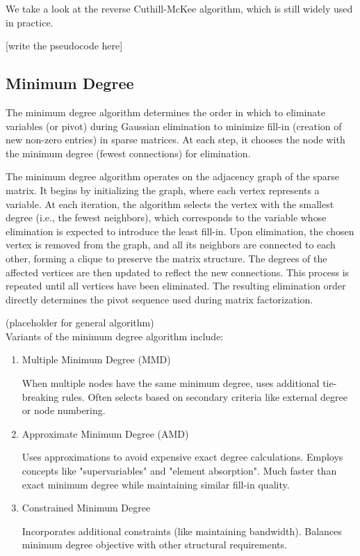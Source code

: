 We take a look at the reverse Cuthill-McKee algorithm, which is still widely used in practice. 

[write the pseudocode here]

\subsection{Minimum Degree}

The minimum degree algorithm determines the order in which to eliminate variables (or pivot) during Gaussian elimination to minimize fill-in (creation of new non-zero entries) in sparse matrices. At each step, it chooses the node with the minimum degree (fewest connections) for elimination.

The minimum degree algorithm operates on the adjacency graph of the sparse matrix. It begins by initializing the graph, where each vertex represents a variable. At each iteration, the algorithm selects the vertex with the smallest degree (i.e., the fewest neighbors), which corresponds to the variable whose elimination is expected to introduce the least fill-in. Upon elimination, the chosen vertex is removed from the graph, and all its neighbors are connected to each other, forming a clique to preserve the matrix structure. The degrees of the affected vertices are then updated to reflect the new connections. This process is repeated until all vertices have been eliminated. The resulting elimination order directly determines the pivot sequence used during matrix factorization.

(placeholder for general algorithm) \\

Variants of the minimum degree algorithm include:

\begin{enumerate}
    \item Multiple Minimum Degree (MMD)

    When multiple nodes have the same minimum degree, uses additional tie-breaking rules. Often selects based on secondary criteria like external degree or node numbering.

    \item Approximate Minimum Degree (AMD)

    Uses approximations to avoid expensive exact degree calculations. Employs concepts like "supervariables" and "element absorption". Much faster than exact minimum degree while maintaining similar fill-in quality.

    \item Constrained Minimum Degree

    Incorporates additional constraints (like maintaining bandwidth). Balances minimum degree objective with other structural requirements.

\end{enumerate}

